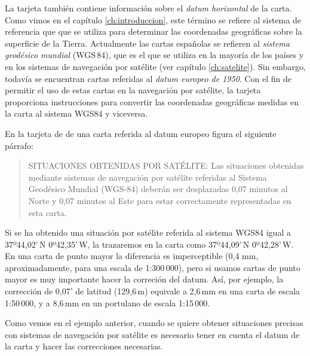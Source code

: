 La tarjeta también contiene información sobre el \emph{datum horizontal} de la carta. Como 
vimos en el capítulo \ref{ch:introduccion}, este término se refiere al sistema de referencia que 
que se utiliza para determinar las coordenadas geográficas sobre la superficie de la Tierra. Actualmente las cartas españolas se 
refieren al \emph{sistema geodésico mundial} (WGS\,84), que es el que se utiliza en la mayoría de los países y 
en los sistemas de navegación por satélite  (ver capítulo \ref{ch:satelite}). Sin embargo, todavía se encuentran cartas referidas al  \emph{datum europeo de 1950}. Con el fin de permitir el uso de estas cartas en la navegación por satélite, la tarjeta proporciona instrucciones para convertir las coordenadas geográficas medidas en la carta al sistema WGS84 y 
viceversa. 


\begin{ejemplo}
En la tarjeta de de una carta referida al datum europeo %
figura el siguiente párrafo: 
\begin{quotation}\noindent
SITUACIONES OBTENIDAS POR SATÉLITE: Las situaciones obtenidas mediante sistemas 
de navegación por satélite referidas al Sistema Geodésico Mundial (WGS-84) deberán ser 
desplazadas 0,07 minutos al Norte y 0,07 minutos al Este para estar correctamente representadas en esta carta. 
\end{quotation}
Si se ha obtenido una situación por satélite referida al sistema WGS84 igual a 37º44,02’\,N
0º42,35’\,W, la trazaremos en la carta como 37º44,09’\,N 0º42,28’\,W. En una carta de punto mayor
la diferencia es imperceptible (0,4 mm, aproximadamente, para una escala de 1:300\,000), pero si usamos cartas de 
punto mayor es muy importante hacer la correción del datum. Así, por ejemplo, la corrección de 0,07’ 
de latitud (129,6\,m) equivale a 2,6\,mm en una carta de escala 1:50\,000, y a 8,6\,mm en un portulano de escala
 1:15\,000.
\end{ejemplo}

Como vemos en el ejemplo anterior, cuando se quiere obtener situaciones precisas con 
sistemas de navegación por satélite es necesario tener en cuenta el datum de la carta y 
hacer las correcciones necesarias. 

